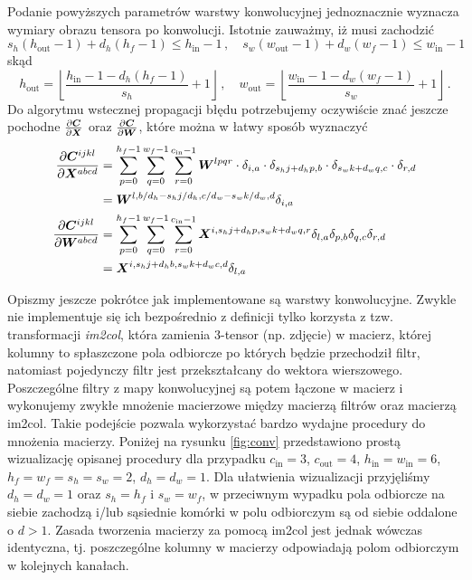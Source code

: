 \documentclass{myclass}
\numberwithin{equation}{subsection}
\begin{document}
Podanie powyższych parametrów warstwy konwolucyjnej jednoznacznie wyznacza wymiary obrazu tensora po
konwolucji. Istotnie zauważmy, iż musi zachodzić
\[
s_h(h_\text{out} - 1) + d_h (h_f - 1) \leq h_\text{in} - 1\,,\quad s_w(w_\text{out} - 1) + d_w (w_f - 1) \leq w_\text{in} - 1
\]
skąd
\[
h_\text{out} = \left\lfloor \frac{h_\text{in} - 1 - d_h (h_f - 1)}{s_h} + 1 \right\rfloor\,,\quad w_\text{out} = \left\lfloor \frac{w_\text{in} - 1 - d_w (w_f - 1)}{s_w} + 1 \right\rfloor\,.
\]
Do algorytmu wstecznej propagacji błędu potrzebujemy oczywiście znać jeszcze pochodne
\(\pdv{\bm{C}}{\bm{X}}\) oraz \(\pdv{\bm{C}}{\bm{W}}\), które można w łatwy sposób wyznaczyć
\[
\begin{split}
\pdv{\bm{C}^{ijkl}}{\bm{X}^{abcd}} &= \sum_{p = 0}^{h_f-1} \sum_{q = 0}^{w_f-1} \sum_{r = 0}^{c_\text{in}-1} \bm{W}^{lpqr} \cdot \delta_{i,a} \cdot \delta_{s_h j + d_h p, b} \cdot \delta_{s_w k + d_w q, c} \cdot \delta_{r, d}\\
&= \bm{W}^{l, b/d_h - s_h j/d_h, c/d_w - s_w k/d_w, d} \delta_{i,a}\\
\pdv{\bm{C}^{ijkl}}{\bm{W}^{abcd}} &= \sum_{p = 0}^{h_f-1} \sum_{q = 0}^{w_f-1} \sum_{r = 0}^{c_\text{in}-1} \bm{X}^{i, s_h j + d_h p, s_w k + d_w q, r} \delta_{l,a} \delta_{p,b} \delta_{q,c} \delta_{r,d}\\
&= \bm{X}^{i, s_h j + d_h b, s_w k + d_w c, d} \delta_{l,a}
\end{split}
\]

Opiszmy jeszcze pokrótce jak implementowane są warstwy konwolucyjne. Zwykle nie implementuje się ich
bezpośrednio z definicji tylko korzysta z tzw. transformacji \emph{im2col}, która zamienia 3-tensor
(np. zdjęcie) w macierz, której kolumny to spłaszczone pola odbiorcze po których będzie przechodził
filtr, natomiast pojedynczy filtr jest przekształcany do wektora wierszowego. Poszczególne filtry z
mapy konwolucyjnej są potem łączone w macierz i wykonujemy zwykłe mnożenie macierzowe między
macierzą filtrów oraz macierzą im2col. Takie podejście pozwala wykorzystać bardzo wydajne procedury
do mnożenia macierzy. Poniżej na rysunku \ref{fig:conv} przedstawiono prostą wizualizację opisanej
procedury dla przypadku \(c_\text{in} = 3\), \(c_\text{out} = 4\), \(h_\text{in} = w_\text{in} =
6\), \(h_f = w_f = s_h = s_w = 2\), \(d_h = d_w = 1\). Dla ułatwienia wizualizacji przyjęliśmy \(d_h
= d_w = 1\) oraz \(s_h = h_f\) i \(s_w = w_f\), w przeciwnym wypadku pola odbiorcze na siebie
zachodzą i/lub sąsiednie komórki w polu odbiorczym są od siebie oddalone o \(d > 1\). Zasada
tworzenia macierzy za pomocą im2col jest jednak wówczas identyczna, tj. poszczególne kolumny w
macierzy odpowiadają polom odbiorczym w kolejnych kanałach.
\end{document}

